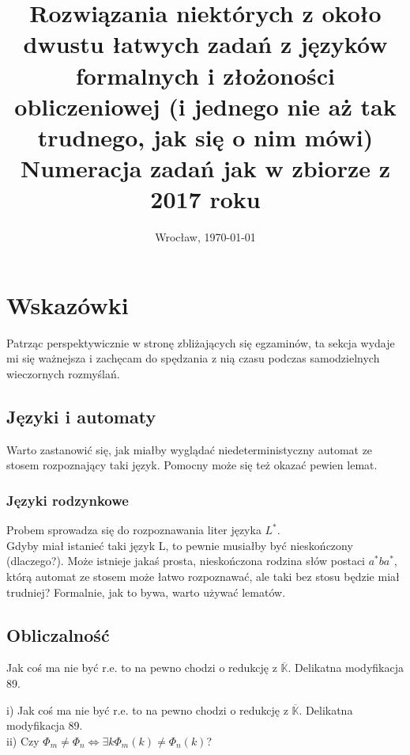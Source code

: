 \documentclass[a4paper,11pt]{article}
\date{Wrocław, \today}
\title{\LARGE{\textbf{Rozwiązania niektórych z około dwustu łatwych zadań z języków formalnych i złożoności obliczeniowej 
(i jednego nie aż tak trudnego, jak się o nim mówi)}\\\Large{Numeracja zadań jak w zbiorze z 2017 roku}}}
\author{}
\newenvironment{zadanie}[1]
  {\renewcommand\theinnercustomthm{#1}\innercustomthm}
  {\endinnercustomthm}
\begin{document}
\maketitle

\section{Wskazówki}

Patrząc perspektywicznie w stronę zbliżających się egzaminów, ta sekcja wydaje mi się ważnejsza i zachęcam do spędzania z nią
czasu podczas samodzielnych wieczornych rozmyślań.

\subsection{Języki i automaty}

\begin{zadanie}{63}
Warto zastanowić się, jak miałby wyglądać niedeterministyczny automat ze stosem rozpoznający taki język. Pomocny może się też
okazać pewien lemat.
\end{zadanie}

\subsubsection{Języki rodzynkowe}

\begin{zadanie}{71}
Probem sprowadza się do rozpoznawania liter języka $L^*$. \\
Gdyby miał istanieć taki język L, to pewnie musiałby być nieskończony (dlaczego?). Może istnieje jakaś prosta, nieskończona
rodzina słów postaci $a^*ba^*$, którą automat ze stosem może łatwo rozpoznawać, ale taki bez stosu będzie miał trudniej?
Formalnie, jak to bywa, warto używać lematów.
\end{zadanie}

\subsection{Obliczalność}

\begin{zadanie}{92}
Jak coś ma nie być r.e. to na pewno chodzi o redukcję z $\overline{\mathbb{K}}$. Delikatna modyfikacja 89.
\end{zadanie}

\begin{zadanie}{99}
i) Jak coś ma nie być r.e. to na pewno chodzi o redukcję z $\overline{\mathbb{K}}$. Delikatna modyfikacja 89. \\
ii) Czy $\Phi_m \neq \Phi_n \Longleftrightarrow \exists k \Phi_m(k) \neq \Phi_n(k)$?
\end{zadanie}
\end{document}
